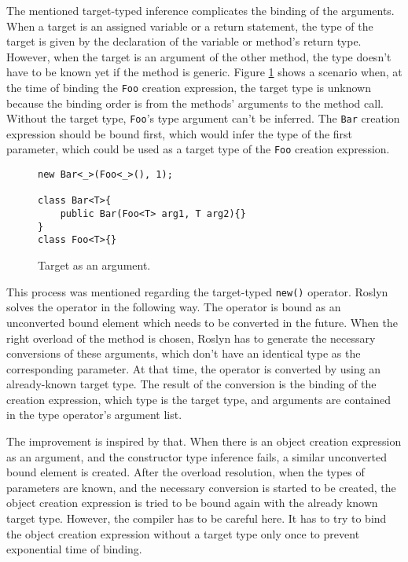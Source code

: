 The mentioned target-typed inference complicates the binding of the arguments. 
When a target is an assigned variable or a return statement, the type of the target is given by the declaration of the variable or method’s return type. 
However, when the target is an argument of the other method, the type doesn’t have to be known yet if the method is generic. 
Figure \ref{img60:target} shows a scenario when, at the time of binding the \texttt{Foo} creation expression, the target type is unknown because the binding order is from the methods’ arguments to the method call. 
Without the target type, \texttt{Foo}'s type argument can’t be inferred. 
The \texttt{Bar} creation expression should be bound first, which would infer the type of the first parameter, which could be used as a target type of the \texttt{Foo} creation expression.
\begin{figure}[h!]
\begin{lstlisting}[style=csharp, mathescape=true]
new Bar<_>(Foo<_>(), 1);

class Bar<T>{
    public Bar(Foo<T> arg1, T arg2){}
}
class Foo<T>{}
\end{lstlisting}
\caption{Target as an argument.}
\label{img60:target}
\end{figure}
\par
This process was mentioned regarding the target-typed \texttt{new()} operator. 
Roslyn solves the operator in the following way. The operator is bound as an unconverted bound element which needs to be converted in the future. 
When the right overload of the method is chosen, Roslyn has to generate the necessary conversions of these arguments, which don't have an identical type as the corresponding parameter. 
At that time, the operator is converted by using an already-known target type. 
The result of the conversion is the binding of the creation expression, which type is the target type, and arguments are contained in the type operator’s argument list.
\par
The improvement is inspired by that. 
When there is an object creation expression as an argument, and the constructor type inference fails, a similar unconverted bound element is created. 
After the overload resolution, when the types of parameters are known, and the necessary conversion is started to be created, the object creation expression is tried to be bound again with the already known target type. 
However, the compiler has to be careful here. 
It has to try to bind the object creation expression without a target type only once to prevent exponential time of binding.
